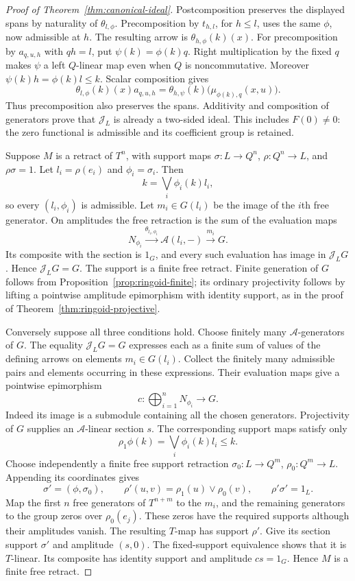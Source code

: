 \begin{proof}[Proof of Theorem~\ref{thm:canonical-ideal}]
Postcomposition preserves the displayed spans by naturality of
$\theta_{l,\phi}$. Precomposition by $t_{h,l}$, for $h\leq l$, uses the
same $\phi$, now admissible at $h$. The resulting arrow is
$\theta_{h,\phi}(k)(x)$.
For precomposition by $a_{q,u,h}$ with $qh=l$, put
$\psi(k)=\phi(k)q$. Right multiplication by the fixed $q$ makes $\psi$
a left $Q$-linear map even when $Q$ is noncommutative. Moreover
$\psi(k)h=\phi(k)l\leq k$. Scalar composition gives
\[
 \theta_{l,\phi}(k)(x)a_{q,u,h}
 =\theta_{h,\psi}(k)\bigl(\mu_{\phi(k),q}(x,u)\bigr).
\]
Thus precomposition also preserves the spans. Additivity and composition
of generators prove that $\mathcal J_L$ is already a two-sided ideal.
This includes $F(0)\ne0$: the zero functional is admissible and its
coefficient group is retained.

Suppose $M$ is a retract of $T^n$, with support maps
$\sigma:L\to Q^n$, $\rho:Q^n\to L$, and $\rho\sigma=1$.
Let $l_i=\rho(e_i)$ and $\phi_i=\sigma_i$. Then
\[
 k=\bigvee_i\phi_i(k)l_i,
\]
so every $(l_i,\phi_i)$ is admissible. Let $m_i\in G(l_i)$ be the image
of the $i$th free generator. On amplitudes the free retraction is the
sum of the evaluation maps
\[
 N_{\phi_i}\xrightarrow{\theta_{l_i,\phi_i}}
 \mathcal A(l_i,-)\xrightarrow{m_i}G.
\]
Its composite with the section is $1_G$, and every such evaluation has
image in $\mathcal J_LG$. Hence $\mathcal J_LG=G$. The support is a
finite free retract. Finite generation of $G$ follows from
Proposition~\ref{prop:ringoid-finite}; its ordinary projectivity follows
by lifting a pointwise amplitude epimorphism with identity support, as in
the proof of Theorem~\ref{thm:ringoid-projective}.

Conversely suppose all three conditions hold. Choose finitely many
$\mathcal A$-generators of $G$. The equality $\mathcal J_LG=G$ expresses
each as a finite sum of values of the defining arrows on elements
$m_i\in G(l_i)$. Collect the finitely many admissible pairs and elements
occurring in these expressions. Their evaluation maps give a pointwise
epimorphism
\[
 c:\bigoplus_{i=1}^nN_{\phi_i}\longrightarrow G.
\]
Indeed its image is a submodule containing all the chosen generators.
Projectivity of $G$ supplies an $\mathcal A$-linear section $s$.
The corresponding support maps satisfy only
\[
 \rho_1\phi(k)=\bigvee_i\phi_i(k)l_i\leq k.
\]
Choose independently a finite free support retraction
$\sigma_0:L\to Q^m$, $\rho_0:Q^m\to L$. Appending its coordinates gives
\[
 \sigma'=(\phi,\sigma_0),\qquad
 \rho'(u,v)=\rho_1(u)\vee\rho_0(v),\qquad
 \rho'\sigma'=1_L.
\]
Map the first $n$ free generators of $T^{n+m}$ to the $m_i$, and the
remaining generators to the group zeros over $\rho_0(e_j)$.
These zeros have the required supports although their amplitudes vanish.
The resulting $T$-map has support $\rho'$. Give its section support
$\sigma'$ and amplitude $(s,0)$. The fixed-support equivalence shows
that it is $T$-linear. Its composite has identity support and amplitude
$cs=1_G$. Hence $M$ is a finite free retract.


\end{proof}
